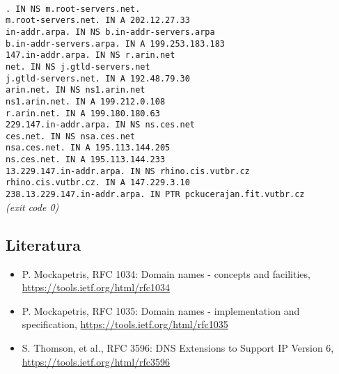 \documentclass[11pt, a4paper, titlepage]{article}
\begin{document}
\begin{framed}
	 \\
	\texttt{.	IN	NS	m.root-servers.net. \\
	m.root-servers.net.	IN	A	202.12.27.33 \\
	in-addr.arpa.	IN	NS	b.in-addr-servers.arpa \\
	b.in-addr-servers.arpa.	IN	A	199.253.183.183 \\
	147.in-addr.arpa.	IN	NS	r.arin.net \\
	net.	IN	NS	j.gtld-servers.net \\
	j.gtld-servers.net.	IN	A	192.48.79.30 \\
	arin.net.	IN	NS	ns1.arin.net \\
	ns1.arin.net.	IN	A	199.212.0.108 \\
	r.arin.net.	IN	A	199.180.180.63 \\
	229.147.in-addr.arpa.	IN	NS	ns.ces.net \\
	ces.net.	IN	NS	nsa.ces.net \\
	nsa.ces.net.	IN	A	195.113.144.205 \\
	ns.ces.net.	IN	A	195.113.144.233 \\
	13.229.147.in-addr.arpa. IN	NS	rhino.cis.vutbr.cz \\
	rhino.cis.vutbr.cz.	IN	A	147.229.3.10 \\
	238.13.229.147.in-addr.arpa. IN	PTR	pckucerajan.fit.vutbr.cz \\ }
	\textit{(exit code 0)}
\end{framed}



\subsection*{Literatura}

\begin{itemize}
	\item P. Mockapetris, RFC 1034: Domain names - concepts and facilities, \url{https://tools.ietf.org/html/rfc1034}
	\item P. Mockapetris, RFC 1035: Domain names - implementation and specification, \url{https://tools.ietf.org/html/rfc1035}
	\item S. Thomson, et al., RFC 3596: DNS Extensions to Support IP Version 6, \url{https://tools.ietf.org/html/rfc3596}
\end{itemize}
\end{document}
